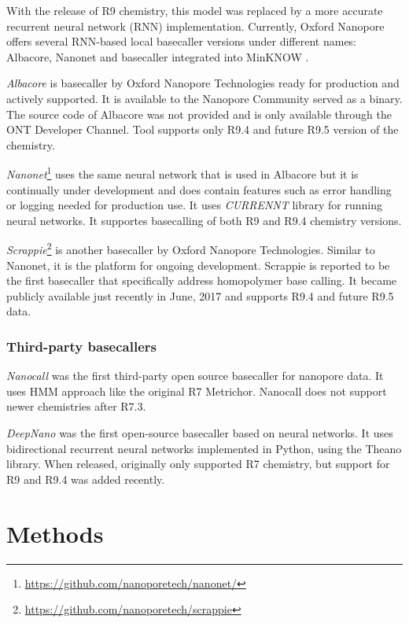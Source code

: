 \documentclass[times, utf8, diplomski, english]{fer}
\begin{document}
With the release of R9 chemistry, this model was replaced by a more accurate recurrent neural network (RNN) implementation. Currently, Oxford Nanopore offers several RNN-based local basecaller versions under different names: Albacore, Nanonet and basecaller integrated into MinKNOW \cite{ont-basecallers}.   

\textit{Albacore} is basecaller by Oxford Nanopore Technologies ready for production and actively supported.
It is available to the Nanopore Community served as a binary. The source code of Albacore was not provided and is only available through the ONT Developer Channel. Tool supports only R9.4 and future R9.5 version of the chemistry.

\textit{Nanonet}\footnote{\url{https://github.com/nanoporetech/nanonet/}} uses the same neural network that is used in Albacore but it is continually under development and does contain features such as error handling or logging needed for production use. It uses \textit{CURRENNT} library for running neural networks. It supportes basecalling of both R9 and R9.4 chemistry versions.


\textit{Scrappie}\footnote{\url{https://github.com/nanoporetech/scrappie}} is another basecaller by Oxford Nanopore Technologies. Similar to Nanonet, it is the platform for ongoing development. Scrappie is reported to be the first basecaller  that specifically address homopolymer base calling. It became publicly available just recently in June, 2017 and supports R9.4 and future R9.5 data.

\pagebreak
\subsection{Third-party basecallers}

\textit{Nanocall} \cite{David046086} was the first third-party open source basecaller for nanopore data. It uses HMM approach like the original R7 Metrichor. Nanocall does not support newer chemistries after R7.3.


\textit{DeepNano} \cite{Boza2017}  was the first open-source basecaller based on neural networks. It uses bidirectional recurrent neural networks implemented in Python, using the Theano library. When released, originally only supported R7 chemistry, but support for R9 and R9.4 was added recently.




\chapter{Methods}
\end{document}
